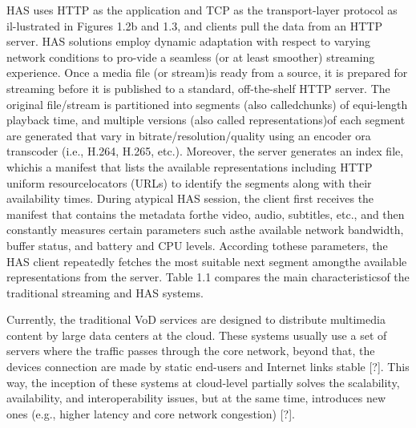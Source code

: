 HAS uses HTTP as the application and TCP as the transport-layer protocol as il-lustrated in Figures 1.2b and 1.3, and clients pull the data from an HTTP server. HAS solutions employ dynamic adaptation with respect to varying network conditions to pro-vide a seamless (or at least smoother) streaming experience. Once a media file (or stream)is ready from a source, it is prepared for streaming before it is published to a standard, off-the-shelf HTTP server. The original file/stream is partitioned into segments (also calledchunks) of equi-length playback time, and multiple versions (also called representations)of each segment are generated that vary in bitrate/resolution/quality using an encoder ora transcoder (i.e., H.264, H.265, etc.). Moreover, the server generates an index file, whichis a manifest that lists the available representations including HTTP uniform resourcelocators (URLs) to identify the segments along with their availability times. During atypical HAS session, the client first receives the manifest that contains the metadata forthe video, audio, subtitles, etc., and then constantly measures certain parameters such asthe available network bandwidth, buffer status, and battery and CPU levels. According tothese parameters, the HAS client repeatedly fetches the most suitable next segment amongthe available representations from the server. Table 1.1 compares the main characteristicsof the traditional streaming and HAS systems.


Currently, the traditional VoD services are designed to distribute multimedia content by large data centers at the cloud. These systems usually use a set of servers where the traffic passes through the core network, beyond that, the devices connection are made by static end-users and Internet links stable [?]. This way, the inception of these systems at cloud-level partially solves the scalability, availability, and interoperability issues, but at the same time, introduces new ones (e.g., higher latency and core network congestion) [?].



